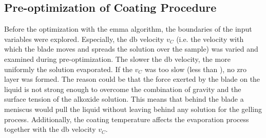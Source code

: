 \subsection{Pre-optimization of Coating Procedure}
Before the optimization with the \gls{emma} algorithm, 
the boundaries of the input variables were explored. 
Especially, the \gls{db} velocity $v_{C}$ (i.e. the velocity with which the blade moves and spreads the solution over the sample)
was varied and examined during pre-optimization. 
The slower the \gls{db} velocity, the more uniformly the solution evaporated. 
If the $v_{C}$ was too slow (less than ), no \gls{zro} layer was formed. 
The reason could be that the force exerted by the blade on the liquid is not strong enough to overcome the combination of gravity and the surface tension of the alkoxide solution.
This means that behind the blade a meniscus would pull the liquid without leaving behind any solution for the gelling process. 
Additionally, the coating temperature affects the evaporation process together with the \gls{db} velocity $v_{C}$. 




